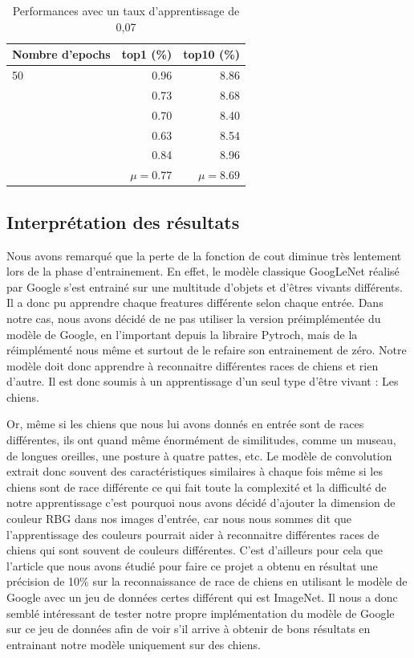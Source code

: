 \documentclass{article}
\begin{document}
\begin{table}[htbp]
\centering
\begin{tabular}{lrr}  
\toprule
Nombre d'epochs  & top1 (\%) & top10 (\%) \\
\midrule
50 & 0.96 & 8.86 \\
     & 0.73 & 8.68 \\
     & 0.70 & 8.40 \\
     & 0.63 & 8.54 \\
     & 0.84 & 8.96 \\
     & $\mu = 0.77$ &  $\mu = 8.69$ \\
\bottomrule
\end{tabular}
\caption{Performances avec un taux d'apprentissage de 0,07}
\label{tab:booktabs}
\end{table}

\subsection{Interprétation des résultats}
Nous avons remarqué que la perte de la fonction de cout diminue très lentement
lors de la phase d’entrainement. En effet, le modèle classique GoogLeNet réalisé
par Google s’est entrainé sur une multitude d’objets et d'êtres vivants
différents. Il a donc pu apprendre chaque freatures différente selon chaque
entrée. Dans notre cas, nous avons décidé de ne pas utiliser la version
préimplémentée du modèle de Google, en l’important depuis la libraire Pytroch,
mais de la réimplémenté nous même et surtout de le refaire son entrainement de
zéro. Notre modèle doit donc apprendre à reconnaitre différentes races de chiens
et rien d’autre. Il est donc soumis à un apprentissage d’un seul type d’être
vivant : Les chiens.

Or, même si les chiens que nous lui avons donnés en entrée sont de races
différentes, ils ont quand même énormément de similitudes, comme un museau, de
longues oreilles, une posture à quatre pattes, etc. Le modèle de convolution
extrait donc souvent des caractéristiques similaires à chaque fois même si les
chiens sont de race différente ce qui fait toute la complexité et la difficulté
de notre apprentissage c’est pourquoi nous avons décidé d’ajouter la dimension
de couleur RBG dans nos images d’entrée, car nous nous sommes dit que
l’apprentissage des couleurs pourrait aider à reconnaitre différentes races de
chiens qui sont souvent de couleurs différentes. C’est d’ailleurs pour cela que
l’article que nous avons étudié pour faire ce projet a obtenu en résultat une
précision de 10\% sur la reconnaissance de race de chiens en utilisant le modèle
de Google avec un jeu de données certes différent qui est ImageNet. Il nous a
donc semblé intéressant de tester notre propre implémentation du modèle de
Google sur ce jeu de données afin de voir s'il arrive à obtenir de bons résultats
en entrainant notre modèle uniquement sur des chiens.
\end{document}
